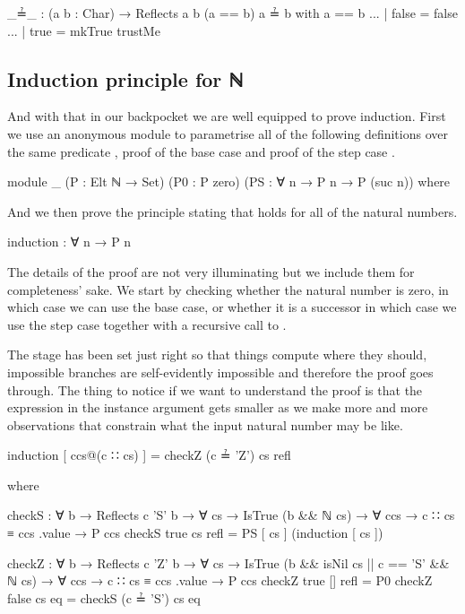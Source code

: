 \documentclass[twocolumn]{article}
\begin{document}
\begin{code}
_≟_ : (a b : Char) → Reflects a b (a == b)
a ≟ b with a == b
... | false = false
... | true = mkTrue trustMe
\end{code}

\subsection{Induction principle for ℕ}

And with that in our backpocket we are well equipped to prove induction.
First we use an anonymous module to parametrise all of the following definitions
over the same predicate , proof of the base case  and proof of the
step case .

\begin{code}
module _ (P : Elt ℕ → Set)
         (P0 : P zero)
         (PS : ∀ n → P n → P (suc n))
         where
\end{code}

And we then prove the  principle stating that  holds for
all of the natural numbers.

\begin{code}
  induction : ∀ n → P n
\end{code}

The details of the proof are not very illuminating but we include them for
completeness' sake. We start by checking
whether the natural number is zero, in which case we can use the base case,
or whether it is a successor in which case we use the step case together
with a recursive call to .

The stage has been set just right so that things compute where they should,
impossible branches are self-evidently impossible and therefore the proof
goes through. The thing to notice if we want to understand the proof is that
the expression in the  instance argument gets smaller as we make
more and more observations that constrain what the input natural number may
be like.

\begin{code}
  induction [ ccs@(c ∷ cs) ] = checkZ (c ≟ 'Z') cs refl

    where

    checkS : ∀ {b} → Reflects c 'S' b → ∀ cs →
      {{IsTrue (b && ℕ cs)}} →
      ∀ {ccs} → c ∷ cs ≡ ccs .value → P ccs
    checkS true cs refl = PS [ cs ] (induction [ cs ])

    checkZ : ∀ {b} → Reflects c 'Z' b → ∀ cs →
      {{IsTrue (b && isNil cs || c == 'S' && ℕ cs)}} →
      ∀ {ccs} → c ∷ cs ≡ ccs .value → P ccs
    checkZ true  [] refl = P0
    checkZ false cs eq   = checkS (c ≟ 'S') cs eq
\end{code}
\end{document}
